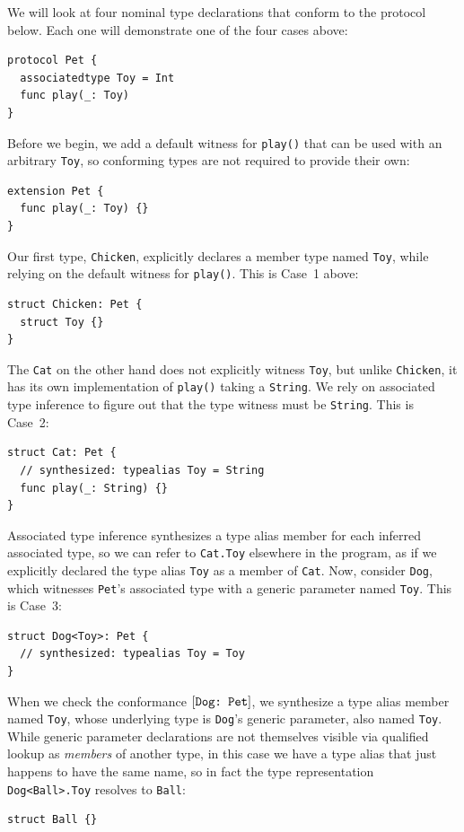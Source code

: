 \documentclass[../generics]{subfiles}
\begin{document}
\begin{example}\label{type witness example}
We will look at four nominal type declarations that conform to the protocol below. Each one will demonstrate one of the four cases above:
\begin{Verbatim}
protocol Pet {
  associatedtype Toy = Int
  func play(_: Toy)
}
\end{Verbatim}
Before we begin, we add a default witness for \texttt{play()} that can be used with an arbitrary \texttt{Toy}, so conforming types are not required to provide their own:
\begin{Verbatim}
extension Pet {
  func play(_: Toy) {}
}
\end{Verbatim}
Our first type, \texttt{Chicken}, explicitly declares a member type named \texttt{Toy}, while relying on the default witness for \texttt{play()}. This is Case~1 above:
\begin{Verbatim}
struct Chicken: Pet {
  struct Toy {}
}
\end{Verbatim}
The \texttt{Cat} on the other hand does not explicitly witness \texttt{Toy}, but unlike \texttt{Chicken}, it has its own implementation of \texttt{play()} taking a \texttt{String}. We rely on associated type inference to figure out that the type witness must be \texttt{String}. This is Case~2:
\begin{Verbatim}
struct Cat: Pet {
  // synthesized: typealias Toy = String
  func play(_: String) {}
}
\end{Verbatim}
Associated type inference synthesizes a type alias member for each inferred associated type, so we can refer to \texttt{Cat.Toy} elsewhere in the program, as if we explicitly declared the type alias \texttt{Toy} as a member of \texttt{Cat}. Now, consider \texttt{Dog}, which witnesses \texttt{Pet}'s associated type with a generic parameter named \texttt{Toy}. This is Case~3:
\begin{Verbatim}
struct Dog<Toy>: Pet {
  // synthesized: typealias Toy = Toy
}
\end{Verbatim}
When we check the conformance $[\texttt{Dog:~Pet}]$, we synthesize a type alias member named \texttt{Toy}, whose underlying type is \texttt{Dog}'s generic parameter, also named \texttt{Toy}. While generic parameter declarations are not themselves visible via qualified lookup as \emph{members} of another type, in this case we have a type alias that just happens to have the same name, so in fact the type representation \texttt{Dog<Ball>.Toy} resolves to \texttt{Ball}:
\begin{Verbatim}
struct Ball {}


\end{Verbatim}
\end{example}
\end{document}
